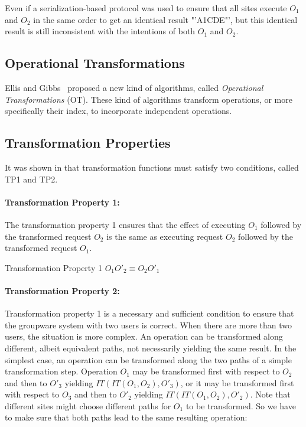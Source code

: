 \documentclass[11pt,a4paper]{article}
\begin{document}
Even if a serialization-based protocol was used to ensure that all sites execute $O_{1}$ and $O_{2}$ in the same order to get an identical result "'A1CDE"', but this identical result is still inconsistent with the intentions of both $O_{1}$ and $O_{2}$.


\subsection{Operational Transformations}
{Ellis and Gibbs}~\cite{ellis} proposed a new kind of algorithms, called \emph{Operational Transformations} (OT).  These kind of algorithms transform operations, or more specifically their index, to incorporate independent operations.

\subsection{Transformation Properties}
It was shown in \cite{ressel:adopted} that transformation functions must satisfy two conditions, called TP1 and TP2.

\paragraph{Transformation Property 1:}
The transformation property 1 ensures that the effect of executing $O_{1}$ followed by the transformed request $O_{2}$ is the same as executing request $O_{2}$ followed by the transformed request $O_{1}$. 

\begin{defn}
Transformation Property 1 $ O_{1} O'_{2} \equiv O_{2} O'_{1} $
\end{defn}

\paragraph{Transformation Property 2:}
Transformation property 1 is a necessary and sufficient condition to ensure that the groupware system with two users is correct. When there are more than two users, the situation is more complex. An operation can be transformed along different, albeit equivalent paths, not necessarily yielding the same result. In the simplest case, an operation can be transformed along the two paths of a simple transformation step. Operation $O_{1}$ may be transformed first with respect to $O_{2}$ and then to $O'_{3}$ yielding $IT(IT(O_{1},O_{2}),O'_{3})$, or it may be transformed first with respect to $O_{3}$ and then to $O'_{2}$ yielding $IT(IT(O_{1},O_{2}),O'_{2})$. Note that different sites might choose different paths for $O_{1}$ to be transformed. So we have to make sure that both paths lead to the same resulting operation:
\end{document}
